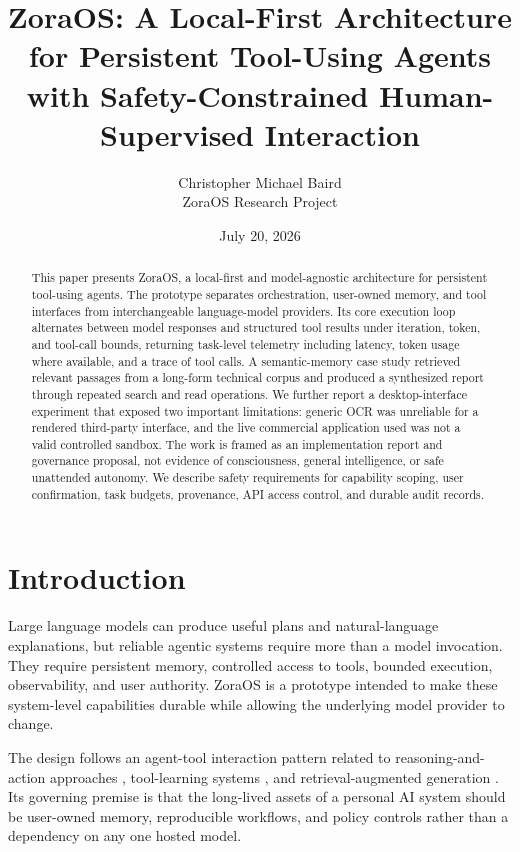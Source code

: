 \documentclass[11pt]{article}
\title{ZoraOS: A Local-First Architecture for Persistent Tool-Using Agents with Safety-Constrained Human-Supervised Interaction}
\author{Christopher Michael Baird\\ZoraOS Research Project}
\date{July 20, 2026}
\begin{document}
\maketitle

\begin{abstract}
This paper presents ZoraOS, a local-first and model-agnostic architecture for persistent tool-using agents. The prototype separates orchestration, user-owned memory, and tool interfaces from interchangeable language-model providers. Its core execution loop alternates between model responses and structured tool results under iteration, token, and tool-call bounds, returning task-level telemetry including latency, token usage where available, and a trace of tool calls. A semantic-memory case study retrieved relevant passages from a long-form technical corpus and produced a synthesized report through repeated search and read operations. We further report a desktop-interface experiment that exposed two important limitations: generic OCR was unreliable for a rendered third-party interface, and the live commercial application used was not a valid controlled sandbox. The work is framed as an implementation report and governance proposal, not evidence of consciousness, general intelligence, or safe unattended autonomy. We describe safety requirements for capability scoping, user confirmation, task budgets, provenance, API access control, and durable audit records.
\end{abstract}

\section{Introduction}
Large language models can produce useful plans and natural-language explanations, but reliable agentic systems require more than a model invocation. They require persistent memory, controlled access to tools, bounded execution, observability, and user authority. ZoraOS is a prototype intended to make these system-level capabilities durable while allowing the underlying model provider to change.

The design follows an agent-tool interaction pattern related to reasoning-and-action approaches \citep{yao2023react}, tool-learning systems \citep{schick2023toolformer}, and retrieval-augmented generation \citep{lewis2020retrieval}. Its governing premise is that the long-lived assets of a personal AI system should be user-owned memory, reproducible workflows, and policy controls rather than a dependency on any one hosted model.
\end{document}
